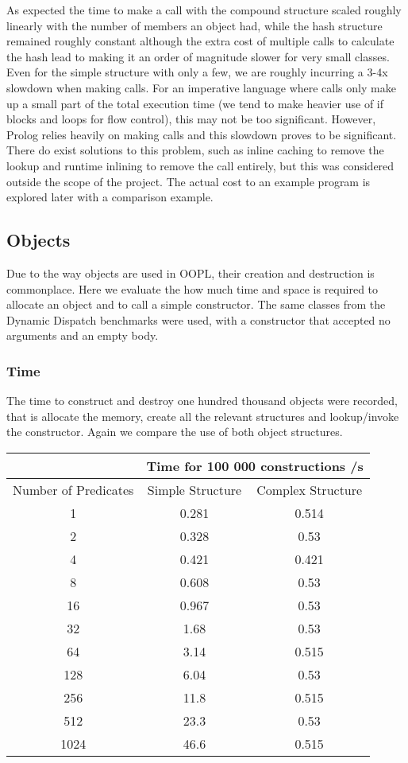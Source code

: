 \documentclass[12pt,a4paper,twoside,openright]{report}
\begin{document}
As expected the time to make a call with the compound structure scaled roughly linearly with the number of members an object had, while the hash structure remained roughly constant although the extra cost of multiple calls to calculate the hash lead to making it an order of magnitude slower for very small classes. Even for the simple structure with only a few, we are roughly incurring a 3-4x slowdown when making calls. For an imperative language where calls only make up a small part of the total execution time (we tend to make heavier use of if blocks and loops for flow control), this may not be too significant. However, Prolog relies heavily on making calls and this slowdown proves to be significant. There do exist solutions to this problem, such as inline caching to remove the lookup and runtime inlining to remove the call entirely, but this was considered outside the scope of the project. The actual cost to an example program is explored later with a comparison example.

\subsection{Objects}

Due to the way objects are used in OOPL, their creation and destruction is commonplace. Here we evaluate the how much time and space is required to allocate an object and to call a simple constructor. The same classes from the Dynamic Dispatch benchmarks were used, with a constructor that accepted no arguments and an empty body.

\subsubsection{Time}

The time to construct and destroy one hundred thousand objects were recorded, that is allocate the memory, create all the relevant structures and lookup/invoke the constructor. Again we compare the use of both object structures.

\begin{center}
\begin{tabular}{c|c|c}

& \multicolumn{2}{c}{Time for 100 000 constructions /s} \\
\hline
Number of Predicates & Simple Structure & Complex Structure \\
\hline
1	&	0.281		&	0.514	\\
2	&	0.328		&	0.53	\\
4	&	0.421		&	0.421	\\
8	&	0.608		&	0.53	\\
16	&	0.967		&	0.53	\\
32	&	1.68		&	0.53	\\
64	&	3.14		&	0.515	\\
128	&	6.04		&	0.53	\\
256	&	11.8		&	0.515	\\
512	&	23.3		&	0.53	\\
1024	&	46.6		&	0.515	\\


\end{tabular}
\end{center}
\end{document}
